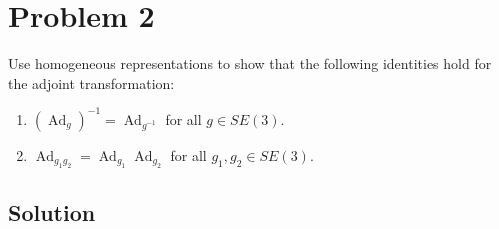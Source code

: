 \section*{Problem 2}

Use homogeneous representations to show that the following identities hold for the adjoint transformation:
\begin{enumerate}[label= (\alph*), noitemsep]
    \item \( \left(\operatorname{Ad}_{g}\right)^{-1}=\operatorname{Ad}_{g^{-1}} \) for all \( g \in S E(3) \).

    \item \( \operatorname{Ad}_{g_{1} g_{2}}=\operatorname{Ad}_{g_{1}} \operatorname{Ad}_{g_{2}} \) for all \( g_{1}, g_{2} \in S E(3) \).
\end{enumerate}

\subsection*{Solution}
